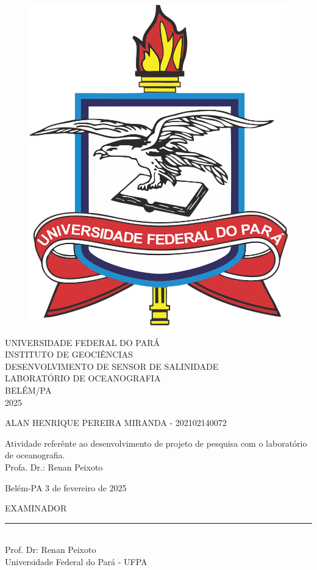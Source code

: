 \thispagestyle{empty}

\begin{center}
	\begin{figure}[h]
  \centering
		\includegraphics[width=0.21\linewidth]{src/logos/ufpa}
		\label{fig:ufpa}
	\end{figure}


	\vspace{1cm}
	\large \uppercase{UNIVERSIDADE FEDERAL DO PARÁ}\\
	\large \uppercase{INSTITUTO DE GEOCIÊNCIAS}\\
	\vspace{7cm}
	\large \uppercase{DESENVOLVIMENTO DE SENSOR DE SALINIDADE}\\
	\vspace{1cm}
	\large \uppercase {LABORATÓRIO DE OCEANOGRAFIA} \\
	\vspace{7cm}
	\large {BELÉM/PA \\ 2025}

 \newpage
 \thispagestyle{empty}
 \large \uppercase{alan henrique pereira miranda - 202102140072}\\
 \vspace{7cm}

 \singlespacing
 \hspace{8cm} %
 \begin{minipage}{7cm}
	Atividade referênte ao desenvolvimento de projeto de pesquisa com o laboratório de oceanografia. \\

	Profa. Dr.: Renan Peixoto\\
	\vspace{1cm}

	Belém-PA 3 de fevereiro de 2025
	\vspace{4cm}
\end{minipage}

\onehalfspacing
\begin{center}

	EXAMINADOR\\
	\vspace{3cm}
	\rule{10cm}{0.15mm} \\
	Prof. Dr: Renan Peixoto\\
	Universidade Federal do Pará - UFPA
\end{center}
\newpage

\begin{center}
    \thispagestyle{empty}
	\listoffigures
	\newpage
    \thispagestyle{empty}
    \tableofcontents

\end{center}

\newpage
\thispagestyle{empty}

\end{center}